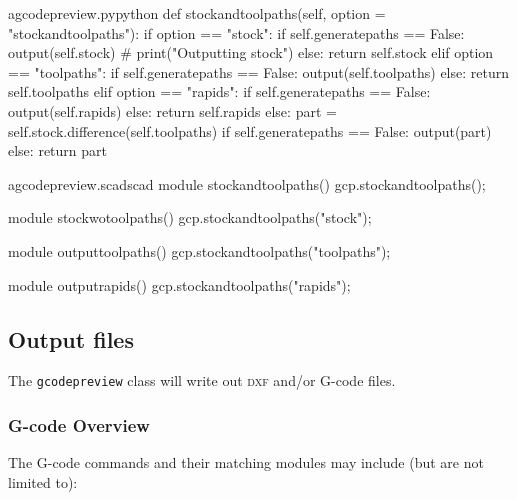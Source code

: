 \documentclass{ltxdoc}
\begin{document}
\lstset{firstnumber=\thegcpy}
\begin{writecode}{a}{gcodepreview.py}{python}
    def stockandtoolpaths(self, option = "stockandtoolpaths"):
        if option == "stock":
            if self.generatepaths == False:
                output(self.stock)
#                print("Outputting stock")
            else:
                return self.stock
        elif option == "toolpaths":
            if self.generatepaths == False:
                output(self.toolpaths)
            else:
                return self.toolpaths
        elif option == "rapids":
            if self.generatepaths == False:
                output(self.rapids)
            else:
                return self.rapids
        else:
            part = self.stock.difference(self.toolpaths)
            if self.generatepaths == False:
                output(part)
            else:
                return part
                    
\end{writecode}
\addtocounter{gcpy}{24}

\lstset{firstnumber=\thegcpscad}
\begin{writecode}{a}{gcodepreview.scad}{scad}
module stockandtoolpaths(){
    gcp.stockandtoolpaths();
}

module stockwotoolpaths(){
    gcp.stockandtoolpaths("stock");
}

module outputtoolpaths(){
    gcp.stockandtoolpaths("toolpaths");
}

module outputrapids(){
    gcp.stockandtoolpaths("rapids");
}

\end{writecode}
\addtocounter{gcpscad}{16}

\subsection{Output files}

The \verb|gcodepreview| class will write out \textsc{dxf} and/or G-code files.

\subsubsection{G-code Overview}
 
The G-code commands and their matching modules may include (but are not limited to):

\bigskip
\end{document}
